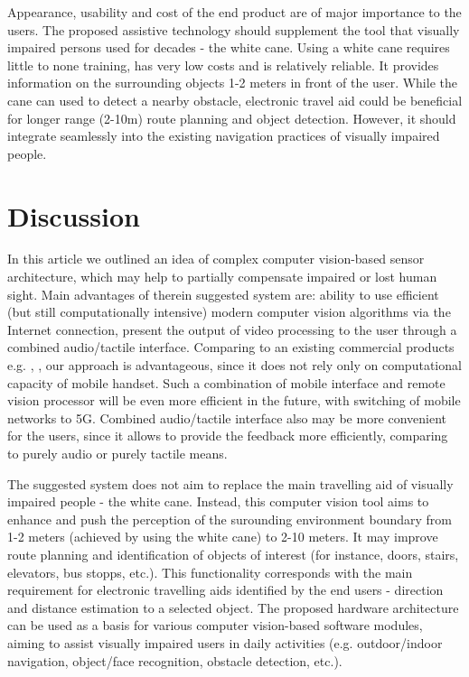 \documentclass[10pt,conference,compsocconf]{IEEEtran}
\begin{document}
Appearance, usability and cost of the end product are of major importance to the users. The proposed assistive technology should supplement the tool that visually impaired persons used for decades - the white cane. Using a white cane requires little to none training, has very low costs and is relatively reliable. It provides information on the surrounding objects 1-2 meters in front of the user. While the cane can used to detect a nearby obstacle, electronic travel aid could be beneficial for longer range (2-10m) route planning and object detection. However, it should integrate seamlessly into the existing navigation practices of visually impaired people. 


 
\section{Discussion}
\label{sec:discussion}


In this article we outlined an idea of complex computer vision-based  sensor architecture, which may help to partially compensate impaired or lost human sight. Main advantages of therein suggested system are: ability to use efficient (but still computationally intensive) modern computer vision algorithms via the Internet connection, present the output of video processing to the user through a combined audio/tactile interface. Comparing to an existing commercial products e.g. \cite{orcam}, \cite{horus}, our approach is advantageous, since it does not rely only on computational capacity of mobile handset. Such a combination of mobile interface and remote vision processor will be even more efficient in the future, with switching of mobile networks to 5G. Combined audio/tactile interface also may be more convenient for the users, since it allows to provide the feedback more efficiently, comparing to purely audio or purely tactile means.

The suggested system does not aim to replace the main travelling aid of visually impaired people - the white cane. Instead, this computer vision tool aims to enhance and push the perception of the surounding environment boundary from 1-2 meters (achieved by using the white cane) to 2-10 meters. It may improve route planning and identification of objects of interest (for instance, doors, stairs, elevators, bus stopps, etc.). This functionality corresponds with the main requirement for electronic travelling aids identified by the end users - direction and distance estimation to a selected object. The proposed hardware architecture can be used as a basis for various computer vision-based software modules, aiming to assist visually impaired users in daily activities (e.g. outdoor/indoor navigation, object/face recognition, obstacle detection, etc.). 
\end{document}
